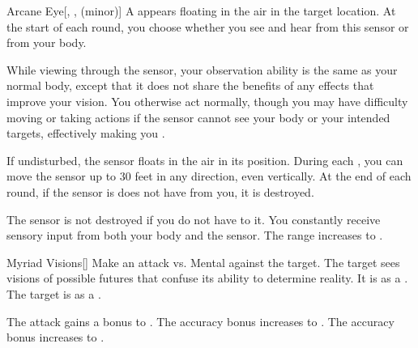 \lowercase{\hypertarget{spell:Arcane Eye}{}}\label{spell:Arcane Eye}
\begin{freeability}[Rank 1]{\hypertarget{spell:Arcane Eye}{Arcane Eye}}[, ,  (minor)]
A  appears floating in the air in the target location.
At the start of each round, you choose whether you see and hear from this sensor or from your body.

While viewing through the sensor, your observation ability is the same as your normal body, except that it does not share the benefits of any  effects that improve your vision.
You otherwise act normally, though you may have difficulty moving or taking actions if the sensor cannot see your body or your intended targets, effectively making you \blinded.

If undisturbed, the sensor floats in the air in its position.
During each , you can move the sensor up to 30 feet in any direction, even vertically.
At the end of each round, if the sensor is does not have  from you, it is destroyed.

\rankline
{} The sensor is not destroyed if you do not have  to it.
 You constantly receive sensory input from both your body and the sensor.
 The range increases to \rnglong.
\end{freeability}
\vspace{0.25em}



\lowercase{\hypertarget{spell:Myriad Visions}{}}\label{spell:Myriad Visions}
\begin{freeability}[Rank 1]{\hypertarget{spell:Myriad Visions}{Myriad Visions}}[]
Make an attack vs. Mental against the target.
\hit The target sees visions of possible futures that confuse its ability to determine reality.
It is  as a .
\crit The target is  as a .

\rankline
{} The attack gains a  bonus to .
 The accuracy bonus increases to .
 The accuracy bonus increases to .
\end{freeability}
\vspace{0.25em}



